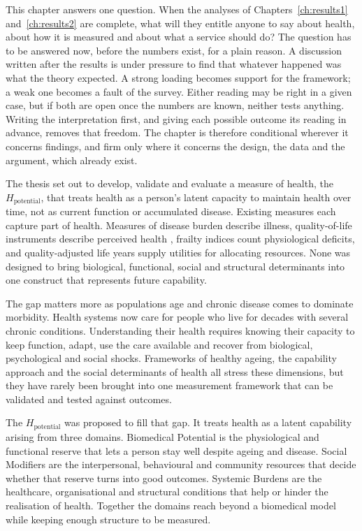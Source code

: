 \noindent This chapter answers one question. When the analyses of
Chapters~\ref{ch:results1} and~\ref{ch:results2} are complete, what will they
entitle anyone to say about health, about how it is measured and about what a
service should do? The question has to be answered now, before the numbers exist,
for a plain reason. A discussion written after the results is under pressure to
find that whatever happened was what the theory expected. A strong loading becomes
support for the framework; a weak one becomes a fault of the survey. Either reading
may be right in a given case, but if both are open once the numbers are known,
neither tests anything. Writing the interpretation first, and giving each possible
outcome its reading in advance, removes that freedom. The chapter is therefore
conditional wherever it concerns findings, and firm only where it concerns the
design, the data and the argument, which already exist.

\noindent The thesis set out to develop, validate and evaluate a measure of health, the $H_{\text{potential}}$, that treats health as a person's latent capacity to maintain health over time, not as current function or accumulated disease. Existing measures each capture part of health. Measures of disease burden describe illness, quality-of-life instruments describe perceived health \citep{whitehead_2010}, frailty indices count physiological deficits, and quality-adjusted life years supply utilities for allocating resources. None was designed to bring biological, functional, social and structural determinants into one construct that represents future capability.

The gap matters more as populations age and chronic disease comes to dominate morbidity. Health systems now care for people who live for decades with several chronic conditions. Understanding their health requires knowing their capacity to keep function, adapt, use the care available and recover from biological, psychological and social shocks. Frameworks of healthy ageing, the capability approach and the social determinants of health all stress these dimensions, but they have rarely been brought into one measurement framework that can be validated and tested against outcomes.

The $H_{\text{potential}}$ was proposed to fill that gap. It treats health as a latent capability arising from three domains. Biomedical Potential is the physiological and functional reserve that lets a person stay well despite ageing and disease. Social Modifiers are the interpersonal, behavioural and community resources that decide whether that reserve turns into good outcomes. Systemic Burdens are the healthcare, organisational and structural conditions that help or hinder the realisation of health. Together the domains reach beyond a biomedical model while keeping enough structure to be measured.

